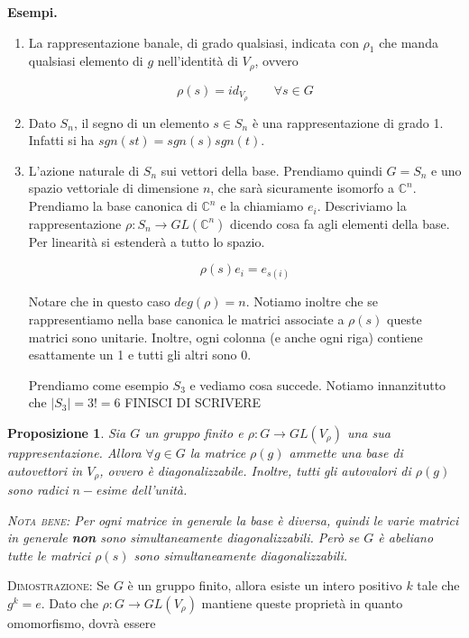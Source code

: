 \documentclass[11pt]{article}
\theoremstyle{plain}
\newtheorem{prop}[thm]{Proposizione}
\theoremstyle{definition}
\theoremstyle{remark}
\newcommand{\C}{\mathbb{C}}
\begin{document}
\textbf{Esempi.}
\begin{enumerate}
	\item La rappresentazione banale, di grado qualsiasi, indicata con $\rho_1$ che manda qualsiasi elemento di $g$ nell'identità di $V_\rho$, ovvero
	
	\[ \rho(s ) = id_{V_\rho} \qquad \forall s \in G\]
	\item Dato $S_n$, il segno di un elemento $s\in S_n$ è una rappresentazione di grado 1. Infatti si ha $sgn(st) = sgn(s) sgn(t)$.
	\item L'azione naturale di $S_n$ sui vettori della base. Prendiamo quindi $G = S_n$ e uno spazio vettoriale di dimensione $n$, che sarà sicuramente isomorfo a $\C^n$. Prendiamo la base canonica di $\C^n$ e la chiamiamo $e_i$. Descriviamo la rappresentazione $\rho: S_n \to GL(\C^n)$ dicendo cosa fa agli elementi della base. Per linearità si estenderà a tutto lo spazio.
	
	\[ \rho(s) e_i = e_{s(i)}\]
	
	Notare che in questo caso $deg(\rho) = n$. Notiamo inoltre che se rappresentiamo nella base canonica le matrici associate a $\rho(s)$ queste matrici sono unitarie. Inoltre, ogni colonna (e anche ogni riga) contiene esattamente un 1 e tutti gli altri sono 0.
	
	Prendiamo come esempio $S_3$ e vediamo cosa succede. Notiamo innanzitutto che $ |S_3| = 3! = 6$
	FINISCI DI SCRIVERE
\end{enumerate}








\begin{prop}
Sia $G$ un gruppo finito e $\rho: G \to GL(V_\rho)$ una sua rappresentazione. Allora $\forall g \in G$ la matrice $\rho(g)$ ammette una base di autovettori in $V_\rho$, ovvero è diagonalizzabile. Inoltre, tutti gli autovalori di $\rho(g)$ sono radici $n-$esime dell'unità.

\textsc{Nota bene:} Per ogni matrice in generale la base è diversa, quindi le varie matrici in generale \textbf{non} sono simultaneamente diagonalizzabili.
Però se $G$ è abeliano tutte le matrici $\rho(s)$ sono simultaneamente diagonalizzabili. 

\label{prop:diagonalizzabilita rappresentazioni}
\end{prop}

\textsc{Dimostrazione:} Se $G$ è un gruppo finito, allora esiste un intero positivo $k$ tale che $g^k = e$. Dato che $\rho:G\to GL(V_\rho)$ mantiene queste proprietà in quanto omomorfismo, dovrà essere
\end{document}
